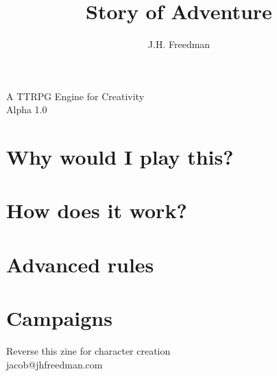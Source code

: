 \documentclass[statementpaper,oneside,article,14pt]{memoir}
\newcommand{\BackgroundPic}[1]{%
	\put(0,0){%
		\parbox[b][\paperheight]{\paperwidth}{%
			\vfill
			\centering
			{\transparent{0.4} \texttt{[image: \#1]}}%
			\vfill
}}}
\begin{document}
	
	
	\title{Story of Adventure}
	\author{J.H. Freedman}
	\date{}
	
	\begingroup
	\let\cleardoublepage\clearpage
	
	
	\begin{titlingpage}
		\maketitle
		
		A TTRPG Engine for Creativity\\Alpha 1.0
		
	\end{titlingpage}
	
	\endgroup
	
	\pagestyle{empty}
	
	
	
	\section*{Why would I play this?}
	
	\section*{How does it work?}
	
	\section*{Advanced rules}
	
	\section*{Campaigns}
	
	
	
	\newpage
	
	Reverse this zine for character creation
	\\jacob@jhfreedman.com
	
\end{document}
